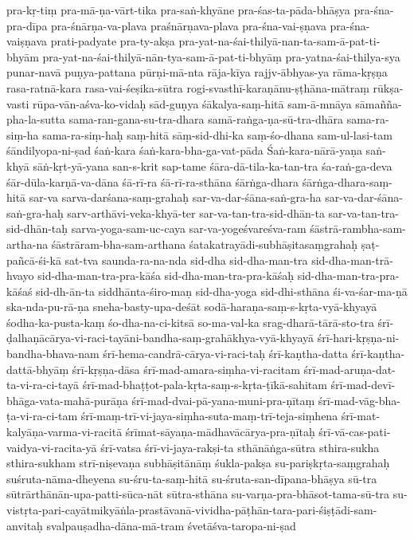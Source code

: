 {{pra-kṛ-tiṃ
pra-mā-ṇa-vārt-tika
pra-saṅ-khyāne
pra-śas-ta-pāda-bhāṣya
pra-śna-pra-dīpa
pra-śnārṇa-va-plava
praśnārṇava-plava
pra-śna-vai-ṣṇava
pra-śna-vaiṣṇava
prati-padyate
pra-ty-akṣa
pra-yat-na-śai-thilyā-nan-ta-sam-ā-pat-ti-bhyām
pra-yat-na-śai-thilyā-nān-tya-sam-ā-pat-ti-bhyāṃ
pra-yatna-śai-thilya-sya
punar-navā
puṇya-pattana
pūrṇi-mā-nta
rāja-kīya
rajjv-ābhyas-ya
rāma-kṛṣṇa
rasa-ratnā-kara
rasa-vai-śeṣika-sūtra
rogi-svasthī-karaṇānu-ṣṭhāna-mātraṃ
rūkṣa-vasti
rūpa-vān-aśva-ko-vidaḥ
sād-guṇya
śākalya-saṃ-hitā
sam-ā-mnāya
sāmañña-pha-la-sutta
sama-ran-gana-su-tra-dhara
samā-raṅga-ṇa-sū-tra-dhāra
sama-ra-siṃ-ha
sama-ra-siṃ-haḥ
saṃ-hitā
sāṃ-sid-dhi-ka
saṃ-śo-dhana
sam-ul-lasi-tam
śāndilyopa-ni-ṣad
śaṅ-kara
śaṅ-kara-bha-ga-vat-pāda
Śaṅ-kara-nārā-yaṇa
saṅ-khyā
sāṅ-kṛt-yā-yana
san-s-krit
sap-tame
śāra-dā-tila-ka-tan-tra
śa-raṅ-ga-deva
śār-dūla-karṇā-va-dāna
śā-rī-ra
śā-rī-ra-sthāna
śārṅga-dhara
śārṅga-dhara-saṃ-hitā
sar-va
sarva-darśana-saṃ-grahaḥ
sar-va-dar-śāna-saṅ-gra-ha
sar-va-dar-śāna-saṅ-gra-haḥ
sarv-arthāvi-veka-khyā-ter
sar-va-tan-tra-sid-dhān-ta
sar-va-tan-tra-sid-dhān-taḥ
sarva-yoga-sam-uc-caya
sar-va-yogeśvareśva-ram
śāstrā-rambha-sam-artha-na
śāstrāram-bha-sam-arthana
śatakatrayādi-subhāṣitasaṃgrahaḥ
ṣaṭ-pañcā-śi-kā
sat-tva
saunda-ra-na-nda
sid-dha
sid-dha-man-tra
sid-dha-man-trā-hvayo
sid-dha-man-tra-pra-kāśa
sid-dha-man-tra-pra-kāśaḥ
sid-dha-man-tra-pra-kāśaś
sid-dh-ān-ta
siddhānta-śiro-maṇ
sid-dha-yoga
sid-dhi-sthāna
śi-va-śar-ma-ṇā
ska-nda-pu-rā-ṇa
sneha-basty-upa-deśāt
sodā-haraṇa-saṃ-s-kṛta-vyā-khyayā
śodha-ka-pusta-kaṃ
śo-dha-na-ci-kitsā
so-ma-val-ka
srag-dharā-tārā-sto-tra
śrī-ḍalhaṇācārya-vi-raci-tayāni-bandha-saṃ-grahākhya-vyā-khyayā
śrī-hari-kṛṣṇa-ni-bandha-bhava-nam
śrī-hema-candrā-cārya-vi-raci-taḥ
śrī-kaṇtha-datta
śrī-kaṇtha-dattā-bhyāṃ
śrī-kṛṣṇa-dāsa
śrī-mad-amara-siṃha-vi-racitam
śrī-mad-aruṇa-dat-ta-vi-ra-ci-tayā
śrī-mad-bhaṭṭot-pala-kṛta-saṃ-s-kṛta-ṭīkā-sahitam
śrī-mad-devī-bhāga-vata-mahā-purāṇa
śrī-mad-dvai-pā-yana-muni-pra-ṇītaṃ
śrī-mad-vāg-bha-ṭa-vi-ra-ci-tam
śrī-maṃ-trī-vi-jaya-siṃha-suta-maṃ-trī-teja-siṃhena
śrī-mat-kalyāṇa-varma-vi-racitā
śrīmat-sāyaṇa-mādhavācārya-pra-ṇītaḥ
śrī-vā-cas-pati-vaidya-vi-racita-yā
śrī-vatsa
śrī-vi-jaya-rakṣi-ta
sthānāṅga-sūtra
sthira-sukha
sthira-sukham
strī-niṣevaṇa
subhāṣitānāṃ
śukla-pakṣa
su-pariṣkṛta-saṃgrahaḥ
suśruta-nāma-dheyena
su-śru-ta-saṃ-hitā
su-śruta-san-dīpana-bhāṣya
sū-tra
sūtrārthānān-upa-patti-sūca-nāt
sūtra-sthāna
su-varṇa-pra-bhāsot-tama-sū-tra
su-vistṛta-pari-cayātmikyāṅla-prastāvanā-vividha-pāṭhān-tara-pari-śiṣṭādi-sam-anvitaḥ
svalpauṣadha-dāna-mā-tram
śvetāśva-taropa-ni-ṣad
}}
